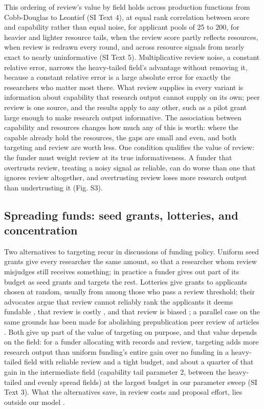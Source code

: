 \documentclass[9pt,twocolumn,twoside]{pnas-new}
\begin{document}
This ordering of review's value by field holds across production functions from Cobb-Douglas to Leontief (SI Text 4), at equal rank correlation between score and capability rather than equal noise, for applicant pools of 25 to 200, for heavier and lighter resource tails, when the review score partly reflects resources, when review is redrawn every round, and across resource signals from nearly exact to nearly uninformative (SI Text 5). Multiplicative review noise, a constant relative error, narrows the heavy-tailed field's advantage without removing it, because a constant relative error is a large absolute error for exactly the researchers who matter most there. What review supplies in every variant is information about capability that research output cannot supply on its own; peer review is one source, and the results apply to any other, such as a pilot grant large enough to make research output informative. The association between capability and resources changes how much any of this is worth: where the capable already hold the resources, the gaps are small and even, and both targeting and review are worth less. One condition qualifies the value of review: the funder must weight review at its true informativeness. A funder that overtrusts review, treating a noisy signal as reliable, can do worse than one that ignores review altogether, and overtrusting review loses more research output than undertrusting it (Fig. S3).



\subsection*{Spreading funds: seed grants, lotteries, and concentration}
Two alternatives to targeting recur in discussions of funding policy. Uniform seed grants give every researcher the same amount, so that a researcher whom review misjudges still receives something; in practice a funder gives out part of its budget as seed grants and targets the rest. Lotteries give grants to applicants chosen at random, usually from among those who pass a review threshold; their advocates argue that review cannot reliably rank the applicants it deems fundable \citep{Pier2018, Shaw2023}, that review is costly \citep{Herbert2013, GrossBergstrom2019}, and that review is biased \citep{Ginther2011, Witteman2019, Boudreau2016, FangCasadevall2016, Avin2019, Roumbanis2019}; a parallel case on the same grounds has been made for abolishing prepublication peer review of articles \citep{HeesenBright2021}. Both give up part of the value of targeting on purpose, and that value depends on the field: for a funder allocating with records and review, targeting adds more research output than uniform funding's entire gain over no funding in a heavy-tailed field with reliable review and a tight budget, and about a quarter of that gain in the intermediate field (capability tail parameter 2, between the heavy-tailed and evenly spread fields) at the largest budget in our parameter sweep (SI Text 3). What the alternatives save, in review costs and proposal effort, lies outside our model \citep{GrossBergstrom2019}.
\end{document}
